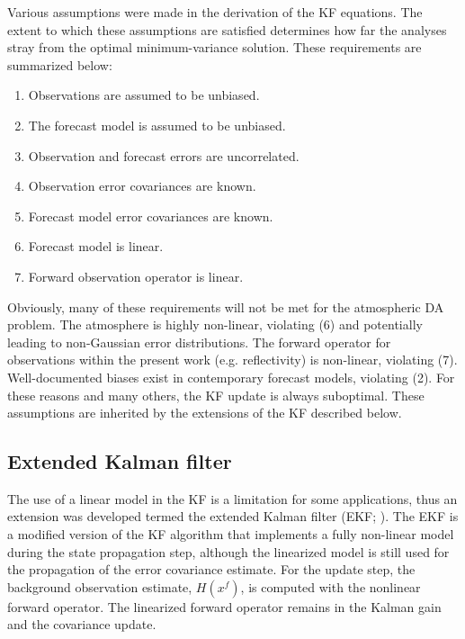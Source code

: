 Various assumptions were made in the derivation of the KF equations. The extent to which these assumptions are satisfied determines how far the analyses stray from the optimal minimum-variance solution. These requirements are summarized below:

\begin{enumerate}
\OUsinglespace
\item Observations are assumed to be unbiased.
\item The forecast model is assumed to be unbiased.
\item Observation and forecast errors are uncorrelated.
\item Observation error covariances are known.
\item Forecast model error covariances are known.
\item Forecast model is linear.
\item Forward observation operator is linear.
\end{enumerate}

Obviously, many of these requirements will not be met for the atmospheric DA problem. The atmosphere is highly non-linear, violating (6) and potentially leading to non-Gaussian error distributions.
The forward operator for observations within the present work (e.g. reflectivity) is non-linear, violating (7). Well-documented biases exist in contemporary forecast models, violating (2). For these reasons and many others, the KF update is always suboptimal. These assumptions are inherited by the extensions of the KF described below.

\subsection{Extended Kalman filter}
The use of a linear model in the KF is a limitation for some applications, thus an extension was developed termed the extended Kalman filter (EKF; \citealt{jazwinski70}). The EKF is a modified version of the KF algorithm that implements a fully non-linear model during the state propagation step, although the linearized model is still used for the propagation of the error covariance estimate. For the update step, the background observation estimate, \(H(x^f)\), is computed with the nonlinear forward operator. The linearized forward operator remains in the Kalman gain and the covariance update.

